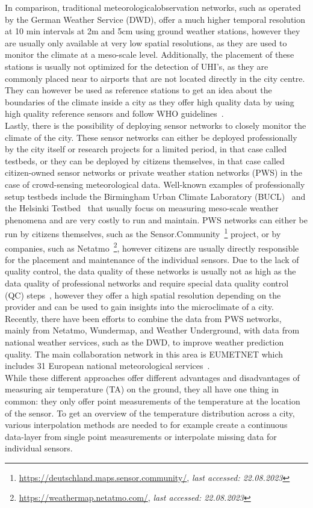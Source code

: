 In comparison, traditional meteorologicalobservation networks, such as operated by the German Weather Service (DWD), offer a much higher temporal resolution at 10 min intervals at 2m and 5cm using ground weather stations, however they are usually only available at very low spatial resolutions, as they are used to monitor the climate at a meso-scale level. Additionally, the placement of these stations is usually not optimized for the detection of UHI's, as they are commonly placed near to airports that are not located directly in the city centre. They can however be used as reference stations to get an idea about the boundaries of the climate inside a city as they offer high quality data by using high quality reference sensors and follow WHO guidelines~\cite{oke2006guideline}.\\
Lastly, there is the possibility of deploying sensor networks to closely monitor the climate of the city. These sensor networks can either be deployed professionally by the city itself or research projects for a limited period, in that case called testbeds, or they can be deployed by citizens themselves, in that case called citizen-owned sensor networks or private weather station networks (PWS) in the case of crowd-sensing meteorological data. Well-known examples of professionally setup testbeds include the Birmingham Urban Climate Laboratory (BUCL)~\cite{chapman2015birmingham} and the Helsinki Testbed~\cite{koskinen2011helsinki} that usually focus on measuring meso-scale weather phenomena and are very costly to run and maintain.
PWS networks can either be run by citizens themselves, such as the Sensor.Community~\footnote{\url{https://deutschland.maps.sensor.community/}, \textit{last accessed: 22.08.2023}} project, or by companies, such as Netatmo~\footnote{\url{https://weathermap.netatmo.com/}, \textit{last accessed: 22.08.2023}}, however citizens are usually directly responsible for the placement and maintenance of the individual sensors. Due to the lack of quality control, the data quality of these networks is usually not as high as the data quality of professional networks and require special data quality control (QC) steps~\cite{fenner2021crowdqc+, meier2017crowdsourcing}, however they offer a high spatial resolution depending on the provider and can be used to gain insights into the microclimate of a city. Recently, there have been efforts to combine the data from PWS networks, mainly from Netatmo, Wundermap, and Weather Underground, with data from national weather services, such as the DWD, to improve weather prediction quality. The main collaboration network in this area is EUMETNET which includes 31 European national meteorological services~\cite{hahn2022observations}.\\
While these different approaches offer different advantages and disadvantages of measuring air temperature (TA) on the ground, they all have one thing in common: they only offer point measurements of the temperature at the location of the sensor. To get an overview of the temperature distribution across a city, various interpolation methods are needed to for example create a continuous data-layer from single point measurements or interpolate missing data for individual sensors.

